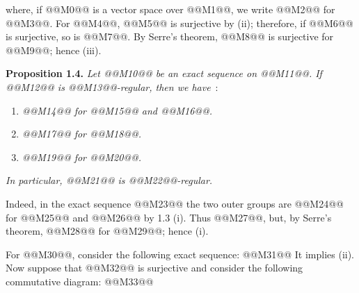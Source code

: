 where, if @@M0@@ is a vector space over @@M1@@, we write @@M2@@ for @@M3@@. For @@M4@@, @@M5@@ is surjective by (ii); therefore, if @@M6@@ is surjective, so is @@M7@@. By Serre's theorem, @@M8@@ is surjective for @@M9@@; hence (iii).

\textbf{Proposition 1.4.} \emph{Let @@M10@@ be an exact sequence on @@M11@@. If @@M12@@ is @@M13@@-regular, then we have}~:
\begin{enumerate}[label=(\roman*)]
\item \emph{@@M14@@ for @@M15@@ and @@M16@@.}
\item \emph{@@M17@@ for @@M18@@.}
\item \emph{@@M19@@ for @@M20@@.}
\end{enumerate}
\emph{In particular, @@M21@@ is @@M22@@-regular.}

Indeed, in the exact sequence
@@M23@@
the two outer groups are @@M24@@ for @@M25@@ and @@M26@@ by 1.3 (i). Thus @@M27@@, but, by Serre's theorem, @@M28@@ for @@M29@@; hence (i).

For @@M30@@, consider the following exact sequence:
@@M31@@
It implies (ii). Now suppose that @@M32@@ is surjective and consider the following commutative diagram:
@@M33@@
